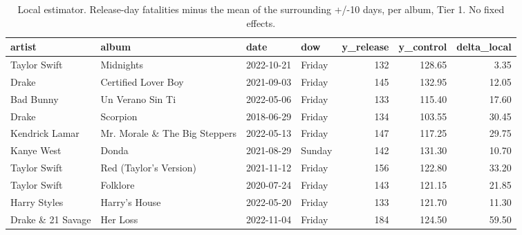 \begin{table}
\caption{Local estimator. Release-day fatalities minus the mean of the surrounding +/-10 days, per album, Tier 1. No fixed effects.}
\begin{tabular}{llllrrr}
\toprule
artist & album & date & dow & y\_release & y\_control & delta\_local \\
\midrule
Taylor Swift & Midnights & 2022-10-21 & Friday & 132 & 128.65 & 3.35 \\
Drake & Certified Lover Boy & 2021-09-03 & Friday & 145 & 132.95 & 12.05 \\
Bad Bunny & Un Verano Sin Ti & 2022-05-06 & Friday & 133 & 115.40 & 17.60 \\
Drake & Scorpion & 2018-06-29 & Friday & 134 & 103.55 & 30.45 \\
Kendrick Lamar & Mr. Morale \& The Big Steppers & 2022-05-13 & Friday & 147 & 117.25 & 29.75 \\
Kanye West & Donda & 2021-08-29 & Sunday & 142 & 131.30 & 10.70 \\
Taylor Swift & Red (Taylor's Version) & 2021-11-12 & Friday & 156 & 122.80 & 33.20 \\
Taylor Swift & Folklore & 2020-07-24 & Friday & 143 & 121.15 & 21.85 \\
Harry Styles & Harry's House & 2022-05-20 & Friday & 133 & 121.70 & 11.30 \\
Drake \& 21 Savage & Her Loss & 2022-11-04 & Friday & 184 & 124.50 & 59.50 \\
\bottomrule
\end{tabular}
\end{table}
